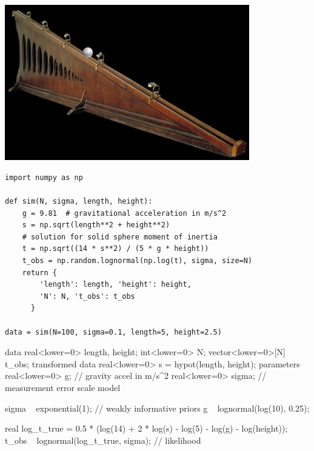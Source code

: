 \documentclass[10pt]{report}
\begin{document}
\begin{center}
\includegraphics[width=0.8\textwidth]{img/galileo-plane.jpeg}
\end{center}

\begin{Verbatim}[fontsize=\small, xleftmargin=3ex]
import numpy as np

def sim(N, sigma, length, height):
    g = 9.81  # gravitational acceleration in m/s^2
    s = np.sqrt(length**2 + height**2)
    # solution for solid sphere moment of inertia
    t = np.sqrt((14 * s**2) / (5 * g * height))
    t_obs = np.random.lognormal(np.log(t), sigma, size=N)
    return {
        'length': length, 'height': height,
        'N': N, 't_obs': t_obs
      }
      
data = sim(N=100, sigma=0.1, length=5, height=2.5)
\end{Verbatim}

\vspace*{-6pt}
\begin{stancode}
data {
  real<lower=0> length, height;  int<lower=0> N;  vector<lower=0>[N] t_obs;
}
transformed data {
  real<lower=0> s = hypot(length, height);
}
parameters {
  real<lower=0> g;      // gravity accel in m/s^2
  real<lower=0> sigma;  // measurement error scale
}
model {
  sigma ~ exponential(1);                 // weakly informative priors
  g ~ lognormal(log(10), 0.25);

  real log_t_true = 0.5 * (log(14) + 2 * log(s) - log(5) - log(g) - log(height));
  t_obs ~ lognormal(log_t_true, sigma);   // likelihood
}
\end{stancode}
\end{document}
